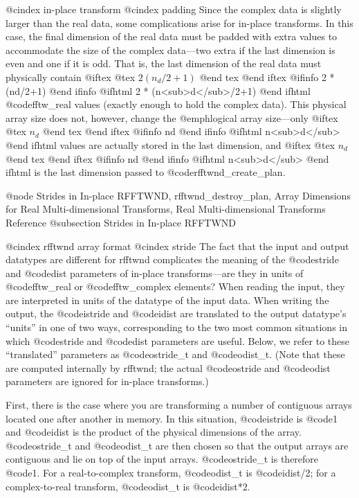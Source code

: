 @cindex in-place transform
@cindex padding
Since the complex data is slightly larger than the real data, some
complications arise for in-place transforms.  In this case, the final
dimension of the real data must be padded with extra values to
accommodate the size of the complex data---two extra if the last
dimension is even and one if it is odd.  That is, the last dimension of
the real data must physically contain
@iftex
@tex
$2 (n_d/2+1)$
@end tex
@end iftex
@ifinfo
2 * (nd/2+1)
@end ifinfo
@ifhtml
2 * (n<sub>d</sub>/2+1)
@end ifhtml
@code{fftw_real} values (exactly enough to hold the complex data).
This physical array size does not, however, change the @emph{logical}
array size---only
@iftex
@tex
$n_d$
@end tex
@end iftex
@ifinfo
nd
@end ifinfo
@ifhtml
n<sub>d</sub>
@end ifhtml
values are actually stored in the last dimension, and
@iftex
@tex
$n_d$
@end tex
@end iftex
@ifinfo
nd
@end ifinfo
@ifhtml
n<sub>d</sub>
@end ifhtml
is the last dimension passed to @code{rfftwnd_create_plan}.

@node Strides in In-place RFFTWND, rfftwnd_destroy_plan, Array Dimensions for Real Multi-dimensional Transforms, Real Multi-dimensional Transforms Reference
@subsection Strides in In-place RFFTWND

@cindex rfftwnd array format
@cindex stride
The fact that the input and output datatypes are different for rfftwnd
complicates the meaning of the @code{stride} and @code{dist} parameters
of in-place transforms---are they in units of @code{fftw_real} or
@code{fftw_complex} elements?  When reading the input, they are
interpreted in units of the datatype of the input data.  When writing
the output, the @code{istride} and @code{idist} are translated to the
output datatype's ``units'' in one of two ways, corresponding to the two
most common situations in which @code{stride} and @code{dist} parameters
are useful.  Below, we refer to these ``translated'' parameters as
@code{ostride_t} and @code{odist_t}.  (Note that these are computed
internally by rfftwnd; the actual @code{ostride} and @code{odist}
parameters are ignored for in-place transforms.)

First, there is the case where you are transforming a number of
contiguous arrays located one after another in memory.  In this
situation, @code{istride} is @code{1} and @code{idist} is the product of
the physical dimensions of the array.  @code{ostride_t} and
@code{odist_t} are then chosen so that the output arrays are contiguous
and lie on top of the input arrays.  @code{ostride_t} is therefore
@code{1}.  For a real-to-complex transform, @code{odist_t} is
@code{idist/2}; for a complex-to-real transform, @code{odist_t} is
@code{idist*2}.

